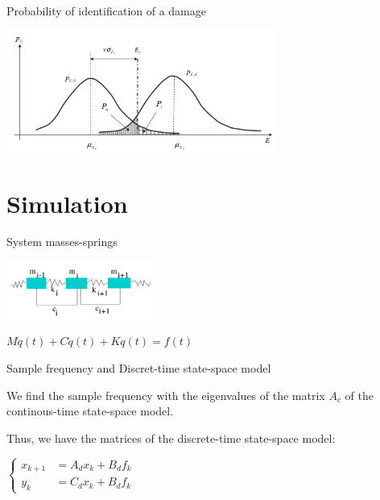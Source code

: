 \documentclass{beamer}
\begin{document}
\begin{frame}{Probability of identification of a damage}
\begin{center}
\includegraphics[height=4cm]{images/gaussiennes.png}
\end{center}
\end{frame}


\section{Simulation}

\begin{frame}{System masses-springs}
\begin{center}
\includegraphics[width=5cm]{images/ressorts.png}

$M \ddot{q}(t) + C \dot{q}(t) + K q(t) = f(t)$
\end{center}




\end{frame}


\begin{frame}{Sample frequency and Discret-time state-space model}

We find the sample frequency with the eigenvalues of the matrix $A_c$ of the continous-time state-space model.

\vspace{5mm}

Thus, we have the matrices of the discrete-time state-space model:
\begin{center}
$\left\{
\begin{array}{ll}
x_{k+1} & = A_dx_k + B_df_k \\
y_k & = C_dx_k + B_df_k
\end{array}
\right.$
\end{center}

\end{frame}
\end{document}
